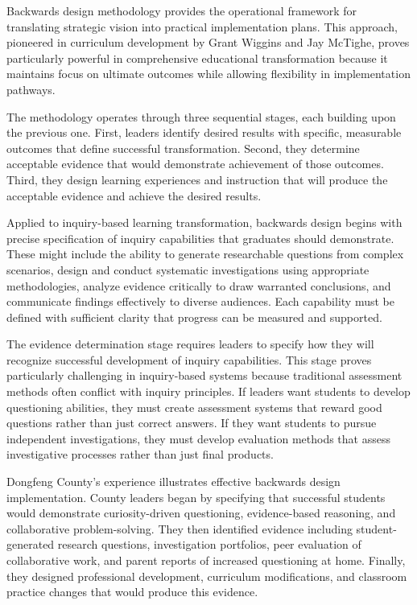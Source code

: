 \documentclass[
  Letterpaper,
]{scrbook}
\begin{document}
Backwards design methodology provides the operational framework for
translating strategic vision into practical implementation plans. This
approach, pioneered in curriculum development by Grant Wiggins and Jay
McTighe, proves particularly powerful in comprehensive educational
transformation because it maintains focus on ultimate outcomes while
allowing flexibility in implementation pathways.

The methodology operates through three sequential stages, each building
upon the previous one. First, leaders identify desired results with
specific, measurable outcomes that define successful transformation.
Second, they determine acceptable evidence that would demonstrate
achievement of those outcomes. Third, they design learning experiences
and instruction that will produce the acceptable evidence and achieve
the desired results.

Applied to inquiry-based learning transformation, backwards design
begins with precise specification of inquiry capabilities that graduates
should demonstrate. These might include the ability to generate
researchable questions from complex scenarios, design and conduct
systematic investigations using appropriate methodologies, analyze
evidence critically to draw warranted conclusions, and communicate
findings effectively to diverse audiences. Each capability must be
defined with sufficient clarity that progress can be measured and
supported.

The evidence determination stage requires leaders to specify how they
will recognize successful development of inquiry capabilities. This
stage proves particularly challenging in inquiry-based systems because
traditional assessment methods often conflict with inquiry principles.
If leaders want students to develop questioning abilities, they must
create assessment systems that reward good questions rather than just
correct answers. If they want students to pursue independent
investigations, they must develop evaluation methods that assess
investigative processes rather than just final products.

Dongfeng County's experience illustrates effective backwards design
implementation. County leaders began by specifying that successful
students would demonstrate curiosity-driven questioning, evidence-based
reasoning, and collaborative problem-solving. They then identified
evidence including student-generated research questions, investigation
portfolios, peer evaluation of collaborative work, and parent reports of
increased questioning at home. Finally, they designed professional
development, curriculum modifications, and classroom practice changes
that would produce this evidence.
\end{document}

